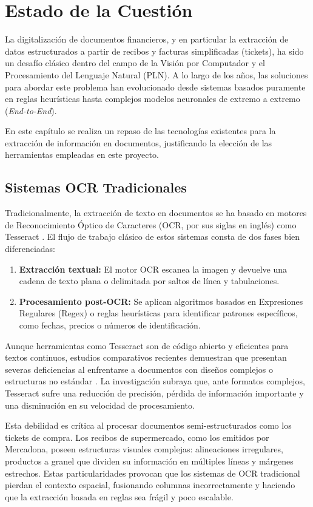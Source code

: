 \chapter{Estado de la Cuestión}
\label{ch:estado_cuestion}

La digitalización de documentos financieros, y en particular la extracción de datos estructurados a partir de recibos y facturas simplificadas (tickets), ha sido un desafío clásico dentro del campo de la Visión por Computador y el Procesamiento del Lenguaje Natural (PLN). A lo largo de los años, las soluciones para abordar este problema han evolucionado desde sistemas basados puramente en reglas heurísticas hasta complejos modelos neuronales de extremo a extremo (\textit{End-to-End}).

En este capítulo se realiza un repaso de las tecnologías existentes para la extracción de información en documentos, justificando la elección de las herramientas empleadas en este proyecto.

\section{Sistemas OCR Tradicionales}
Tradicionalmente, la extracción de texto en documentos se ha basado en motores de Reconocimiento Óptico de Caracteres (OCR, por sus siglas en inglés) como Tesseract . El flujo de trabajo clásico de estos sistemas consta de dos fases bien diferenciadas:
\begin{enumerate}
    \item \textbf{Extracción textual:} El motor OCR escanea la imagen y devuelve una cadena de texto plana o delimitada por saltos de línea y tabulaciones.
    \item \textbf{Procesamiento post-OCR:} Se aplican algoritmos basados en Expresiones Regulares (Regex) o reglas heurísticas para identificar patrones específicos, como fechas, precios o números de identificación.
\end{enumerate}

Aunque herramientas como Tesseract son de código abierto y eficientes para textos continuos, estudios comparativos recientes demuestran que presentan severas deficiencias al enfrentarse a documentos con diseños complejos o estructuras no estándar \parencite{ronquillo2024analisis}. La investigación subraya que, ante formatos complejos, Tesseract sufre una reducción de precisión, pérdida de información importante y una disminución en su velocidad de procesamiento.

Esta debilidad es crítica al procesar documentos semi-estructurados como los tickets de compra. Los recibos de supermercado, como los emitidos por Mercadona, poseen estructuras visuales complejas: alineaciones irregulares, productos a granel que dividen su información en múltiples líneas y márgenes estrechos. Estas particularidades provocan que los sistemas de OCR tradicional pierdan el contexto espacial, fusionando columnas incorrectamente y haciendo que la extracción basada en reglas sea frágil y poco escalable.

